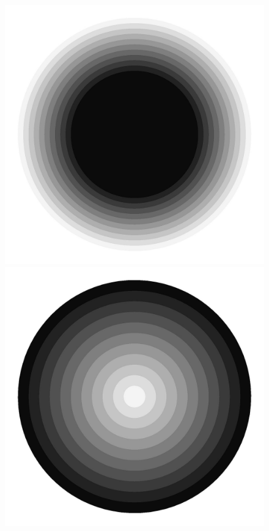\begin{figure}
\begin{minipage}[b]{0.30\linewidth}
    \includegraphics[width=1.0\textwidth]{images/EISMINT_II/vars/adot.jpg}
  \end{minipage}
  \quad
  \begin{minipage}[b]{0.30\linewidth}
    \includegraphics[width=1.0\textwidth]{images/EISMINT_II/vars/T_s.jpg}
  \end{minipage}
  

\end{figure}
